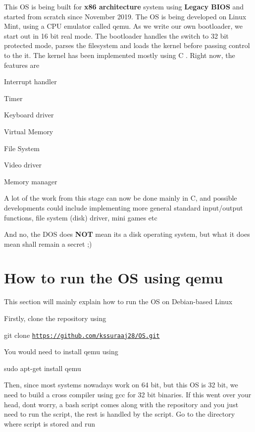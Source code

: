 This OS is being built for {\bfseries x86 architecture} system using {\bfseries Legacy B\+I\+OS} and started from scratch since November 2019. The OS is being developed on Linux Mint, using a C\+PU emulator called qemu. As we write our own bootloader, we start out in 16 bit real mode. The bootloader handles the switch to 32 bit protected mode, parses the filesystem and loads the kernel before passing control to the it. The kernel has been implemented mostly using C . Right now, the features are


\begin{DoxyItemize}
\item Interrupt handler
\item Timer
\item Keyboard driver
\item Virtual Memory
\item File System
\item Video driver
\item Memory manager
\end{DoxyItemize}

A lot of the work from this stage can now be done mainly in C, and possible developments could include implementing more general standard input/output functions, file system (disk) driver, mini games etc

And no, the D\+OS does {\bfseries N\+OT} mean it\textquotesingle{}s a disk operating system, but what it does mean shall remain a secret ;)

\section*{How to run the OS using qemu}

This section will mainly explain how to run the OS on Debian-\/based Linux

Firstly, clone the repository using

{\ttfamily git clone \href{https://github.com/kssuraaj28/OS.git}{\tt https\+://github.\+com/kssuraaj28/\+O\+S.\+git}}

You would need to install qemu using

{\ttfamily sudo apt-\/get install qemu}

Then, since most systems nowadays work on 64 bit, but this OS is 32 bit, we need to build a cross compiler using gcc for 32 bit binaries. If this went over your head, don\textquotesingle{}t worry, a bash script comes along with the repository and you just need to run the script, the rest is handled by the script. Go to the directory where script is stored and run

